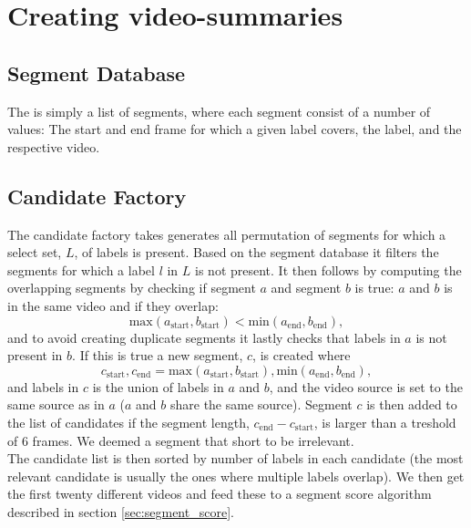 %
\section{Creating video-summaries}
%

%
\subsection{Segment Database}
%
The is simply a list of segments, where each segment consist of a number of values: The start and end frame for which a given label covers, the label, and the respective video.
%
\subsection{Candidate Factory}
%
The candidate factory takes generates all permutation of segments for which a select set, $L$, of labels is present. Based on the segment database it filters the segments for which a label $l$ in $L$ is not present. It then follows by computing the overlapping segments by checking if segment $a$ and segment $b$ is true: $a$ and $b$ is in the same video and if they overlap:
\[
\text{max}(a_{\text{start}}, b_{\text{start}}) < \text{min}(a_{\text{end}}, b_{\text{end}}),
\] %
and to avoid creating duplicate segments it lastly checks that labels in $a$ is not present in $b$. If this is true a new segment, $c$, is created where 
\[
c_{\text{start}}, c_{\text{end}} = \text{max}(a_{\text{start}}, b_{\text{start}}), \text{min}(a_{\text{end}}, b_{\text{end}}),
\]
and labels in $c$ is the union of labels in $a$ and $b$, and the video source is set to the same source as in $a$ ($a$ and $b$ share the same source). Segment $c$ is then added to the list of candidates if the segment length, $c_{\text{end}} - c_{\text{start}}$, is larger than a treshold of 6 frames. We deemed a segment that short to be irrelevant.\\
The candidate list is then sorted by number of labels in each candidate (the most relevant candidate is usually the ones where multiple labels overlap). We then get the first twenty different videos and feed these to a segment score algorithm described in section \ref{sec:segment_score}.
%
